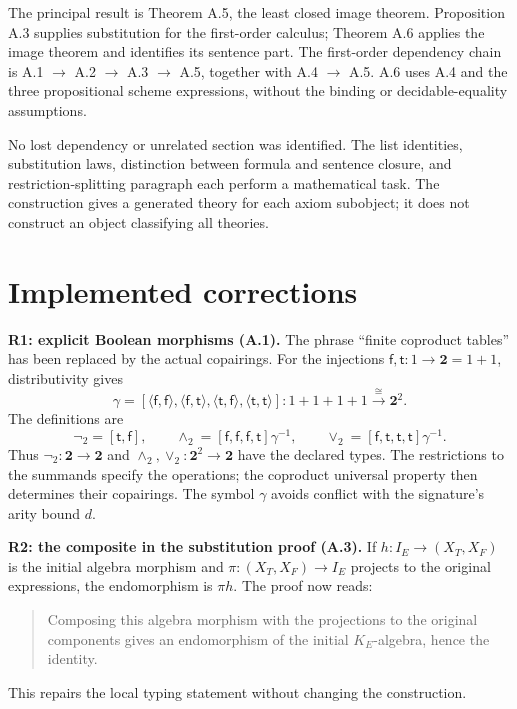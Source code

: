 \documentclass[10pt]{article}
\newcommand{\Two}{\mathbf 2}
\begin{document}
The principal result is Theorem A.5, the least closed image theorem.
Proposition A.3 supplies substitution for the first-order calculus;
Theorem A.6 applies the image theorem and identifies its sentence part.
The first-order dependency chain is A.1 $\to$ A.2 $\to$ A.3 $\to$ A.5,
together with A.4 $\to$ A.5. A.6 uses A.4 and the three propositional
scheme expressions, without the binding or decidable-equality assumptions.

No lost dependency or unrelated section was identified. The list identities,
substitution laws, distinction between formula and sentence closure, and
restriction-splitting paragraph each perform a mathematical task.
The construction gives a generated theory for each axiom subobject;
it does not construct an object classifying all theories.

\newpage
\section*{Implemented corrections}
\textbf{R1: explicit Boolean morphisms (A.1).}
The phrase ``finite coproduct tables'' has been replaced by the actual
copairings. For the injections $\mathsf f,\mathsf t:1\to\Two=1+1$,
distributivity gives
\[
\gamma=[\langle\mathsf f,\mathsf f\rangle,
         \langle\mathsf f,\mathsf t\rangle,
         \langle\mathsf t,\mathsf f\rangle,
         \langle\mathsf t,\mathsf t\rangle]:
         1+1+1+1\xrightarrow{\cong}\Two^2.
\]
The definitions are
\[
\neg_2=[\mathsf t,\mathsf f],\qquad
\wedge_2=[\mathsf f,\mathsf f,\mathsf f,\mathsf t]\gamma^{-1},
\qquad
\vee_2=[\mathsf f,\mathsf t,\mathsf t,\mathsf t]\gamma^{-1}.
\]
Thus $\neg_2:\Two\to\Two$ and
$\wedge_2,\vee_2:\Two^2\to\Two$ have the declared types.
The restrictions to the summands specify the operations; the coproduct
universal property then determines their copairings. The symbol $\gamma$
avoids conflict with the signature's arity bound $d$.

\textbf{R2: the composite in the substitution proof (A.3).}
If $h:I_E\to(X_T,X_F)$ is the initial algebra morphism and
$\pi:(X_T,X_F)\to I_E$ projects to the original expressions, the
endomorphism is $\pi h$. The proof now reads:
\begin{quote}
Composing this algebra morphism with the projections to the original
components gives an endomorphism of the initial $K_E$-algebra, hence the identity.
\end{quote}
This repairs the local typing statement without changing the construction.
\end{document}
